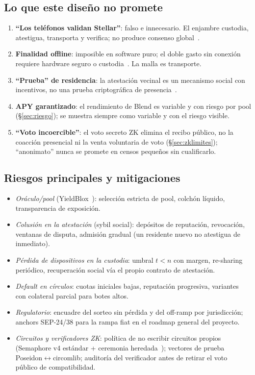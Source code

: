 \documentclass[twocolumn,10pt]{article}
\begin{document}
\subsection{Lo que este dise\~no no promete}
\begin{enumerate}
\item \textbf{``Los tel\'efonos validan Stellar''}: falso e innecesario. El enjambre custodia, atestigua, transporta y verifica; no produce consenso global~\cite{prereq}.
\item \textbf{Finalidad offline}: imposible en software puro; el doble gasto sin conexi\'on requiere hardware seguro o custodia~\cite{polaris}. La malla es transporte.
\item \textbf{``Prueba'' de residencia}: la atestaci\'on vecinal es un mecanismo social con incentivos, no una prueba criptogr\'afica de presencia~\cite{pol}.
\item \textbf{APY garantizado}: el rendimiento de Blend es variable y con riesgo por pool (\S\ref{sec:riesgo}); se muestra siempre como variable y con el riesgo visible.
\item \textbf{``Voto incoercible''}: el voto secreto ZK elimina el recibo p\'ublico, no la coacci\'on presencial ni la venta voluntaria de voto (\S\ref{sec:zklimites}); ``anonimato'' nunca se promete en censos peque\~nos sin cualificarlo.
\end{enumerate}

\subsection{Riesgos principales y mitigaciones}
\begin{itemize}
\item \emph{Or\'aculo/pool} (YieldBlox~\cite{yieldblox}): selecci\'on estricta de pool, colch\'on l\'iquido, transparencia de exposici\'on.
\item \emph{Colusi\'on en la atestaci\'on} (sybil social): dep\'ositos de reputaci\'on, revocaci\'on, ventanas de disputa, admisi\'on gradual (un residente nuevo no atestigua de inmediato).
\item \emph{P\'erdida de dispositivos en la custodia}: umbral $t<n$ con margen, re-sharing peri\'odico, recuperaci\'on social v\'ia el propio contrato de atestaci\'on.
\item \emph{Default en c\'irculos}: cuotas iniciales bajas, reputaci\'on progresiva, variantes con colateral parcial para botes altos.
\item \emph{Regulatorio}: encuadre del sorteo sin p\'erdida y del off-ramp por jurisdicci\'on; anchors SEP-24/38 para la rampa fiat en el roadmap general del proyecto.
\item \emph{Circuitos y verificadores ZK}: pol\'itica de no escribir circuitos propios (Semaphore v4 est\'andar + ceremonia heredada~\cite{semaphore,zkbugs}); vectores de prueba Poseidon$\leftrightarrow$circomlib; auditor\'ia del verificador antes de retirar el voto p\'ublico de compatibilidad.
\end{itemize}
\end{document}
